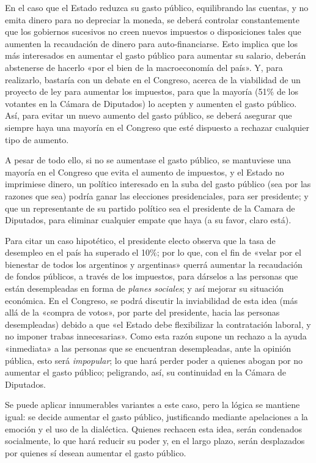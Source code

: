 \documentclass[12pt,a4paper,twoside]{book}
\begin{document}
En el caso que el Estado reduzca su gasto público, equilibrando las cuentas, y no emita dinero para no depreciar la moneda, se deberá controlar constantemente que los gobiernos sucesivos no creen nuevos impuestos o disposiciones tales que aumenten la recaudación de dinero para auto-financiarse. Esto implica que los más interesados en aumentar el gasto público para aumentar su salario, deberán abstenerse de hacerlo «por el bien de la macroeconomía del país». Y, para realizarlo, bastaría con un debate en el Congreso, acerca de la viabilidad de un proyecto de ley para aumentar los impuestos, para que la mayoría (51\% de los votantes en la Cámara de Diputados) lo acepten y aumenten el gasto público. Así, para evitar un nuevo aumento del gasto público, se deberá asegurar que siempre haya una mayoría en el Congreso que esté dispuesto a rechazar cualquier tipo de aumento.

A pesar de todo ello, si no se aumentase el gasto público, se mantuviese una mayoría en el Congreso que evita el aumento de impuestos, y el Estado no imprimiese dinero, un político interesado en la suba del gasto público (sea por las razones que sea) podría ganar las elecciones presidenciales, para ser presidente; y que un representante de su partido político sea el presidente de la Camara de Diputados, para eliminar cualquier empate que haya (a su favor, claro está).

Para citar un caso hipotético, el presidente electo observa que la tasa de desempleo en el país ha superado el 10\%; por lo que, con el fin de «velar por el bienestar de todos los argentinos y argentinas» querrá aumentar la recaudación de fondos públicos, a través de los impuestos, para dárselos a las personas que están desempleadas en forma de \textit{planes sociales}; y así mejorar su situación económica. En el Congreso, se podrá discutir la inviabilidad de esta idea (más allá de la «compra de votos», por parte del presidente, hacia las personas desempleadas) debido a que «el Estado debe flexibilizar la contratación laboral, y no imponer trabas innecesarias». Como esta razón supone un rechazo a la ayuda «inmediata» a las personas que se encuentran desempleadas, ante la opinión pública, esto será \textit{impopular}; lo que hará perder poder a quienes abogan por no aumentar el gasto público; peligrando, así, su continuidad en la Cámara de Diputados.

Se puede aplicar innumerables variantes a este caso, pero la lógica se mantiene igual: se decide aumentar el gasto público, justificando mediante apelaciones a la emoción y el uso de la dialéctica. Quienes rechacen esta idea, serán condenados socialmente, lo que hará reducir su poder y, en el largo plazo, serán desplazados por quienes sí desean aumentar el gasto público.
\end{document}
